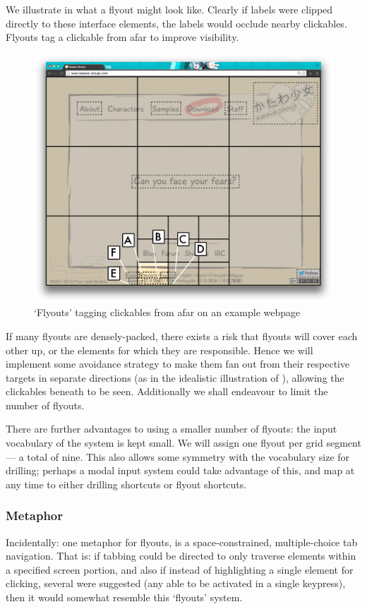 \documentclass[11pt,openright,a4paper]{report}
\begin{document}
We illustrate in  what a flyout might look like. Clearly if labels were clipped directly to these interface elements, the labels would occlude nearby clickables. Flyouts tag a clickable from afar to improve visibility.
\begin{figure}[ht]
\centering\includegraphics[width=\textwidth]{figures/Flyouts.png}
\caption{`Flyouts' tagging clickables from afar on an example webpage}
\label{fig:flyouts}
\end{figure}

\FloatBarrier
If many flyouts are densely-packed, there exists a risk that flyouts will cover each other up, or the elements for which they are responsible. Hence we will implement some avoidance strategy to make them fan out from their respective targets in separate directions (as in the idealistic illustration of ), allowing the clickables beneath to be seen. Additionally we shall endeavour to limit the number of flyouts.

There are further advantages to using a smaller number of flyouts: the input vocabulary of the system is kept small. We will assign one flyout per grid segment --- a total of nine. This also allows some symmetry with the vocabulary size for drilling; perhaps a modal input system could take advantage of this, and map at any time to either drilling shortcuts or flyout shortcuts.

\subsubsection{Metaphor}
Incidentally: one metaphor for flyouts, is a space-constrained, multiple-choice tab navigation. That is: if tabbing could be directed to only traverse elements within a specified screen portion, and also if instead of highlighting a single element for clicking, several were suggested (any able to be activated in a single keypress), then it would somewhat resemble this `flyouts' system.
\end{document}
